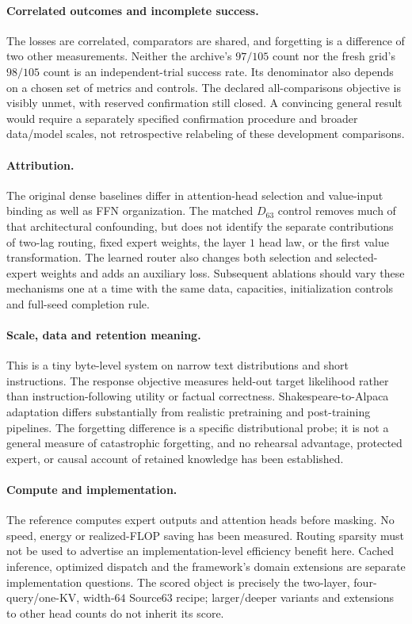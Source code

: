 \documentclass{article}
\begin{document}
\paragraph{Correlated outcomes and incomplete success.}
The losses are correlated, comparators are shared, and forgetting is a difference of two other measurements. Neither the archive's $97/105$ count nor the fresh grid's $98/105$ count is an independent-trial success rate. Its denominator also depends on a chosen set of metrics and controls. The declared all-comparisons objective is visibly unmet, with reserved confirmation still closed. A convincing general result would require a separately specified confirmation procedure and broader data/model scales, not retrospective relabeling of these development comparisons.

\paragraph{Attribution.}
The original dense baselines differ in attention-head selection and value-input binding as well as FFN organization. The matched $D_{63}$ control removes much of that architectural confounding, but does not identify the separate contributions of two-lag routing, fixed expert weights, the layer $1$ head law, or the first value transformation. The learned router also changes both selection and selected-expert weights and adds an auxiliary loss. Subsequent ablations should vary these mechanisms one at a time with the same data, capacities, initialization controls and full-seed completion rule.

\paragraph{Scale, data and retention meaning.}
This is a tiny byte-level system on narrow text distributions and short instructions. The response objective measures held-out target likelihood rather than instruction-following utility or factual correctness. Shakespeare-to-Alpaca adaptation differs substantially from realistic pretraining and post-training pipelines. The forgetting difference is a specific distributional probe; it is not a general measure of catastrophic forgetting, and no rehearsal advantage, protected expert, or causal account of retained knowledge has been established.

\paragraph{Compute and implementation.}
The reference computes expert outputs and attention heads before masking. No speed, energy or realized-FLOP saving has been measured. Routing sparsity must not be used to advertise an implementation-level efficiency benefit here. Cached inference, optimized dispatch and the framework's domain extensions are separate implementation questions. The scored object is precisely the two-layer, four-query/one-KV, width-$64$ Source63 recipe; larger/deeper variants and extensions to other head counts do not inherit its score.
\end{document}
